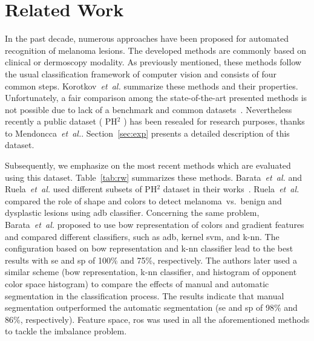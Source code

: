 \section{Related Work}
\label{sec:rw}
In the past decade, numerous approaches have been proposed for automated recognition of melanoma lesions.
The developed methods are commonly based on clinical or dermoscopy modality.
As previously mentioned, these methods follow the usual classification framework of computer vision and consists of four common steps.
Korotkov~\emph{et~al.}\cite{korotkov2012computerized} summarize these methods and their properties.
Unfortunately, a fair comparison among the state-of-the-art presented methods is not possible due to lack of a benchmark and common datasets~\cite{rastgoo2015automatic,korotkov2012computerized}.
Nevertheless recently a public dataset ( PH$^{2}$ ) has been resealed for research purposes, thanks to Mendoncca~\emph{et~al.}\cite{mendoncca2013ph}.
Section~\ref{sec:exp} presents a detailed description of this dataset.

Subsequently, we emphasize on the most recent methods which are evaluated using this dataset.
Table~\ref{tab:rw} summarizes these methods. 
Barata~\emph{et~al.}\cite{barata2013two,barata2013role} and Ruela~\emph{et~al.}\cite{ruela2013role,ruela2013color} used different subsets of PH$^{2}$ dataset in their works~\cite{mendoncca2013ph}.
Ruela~\emph{et~al.}\cite{ruela2013role,ruela2013color} compared the role of shape and colors to detect melanoma~vs.~benign and dysplastic lesions using \ac{adb} classifier.
Concerning the same problem, Barata~\emph{et~al.}\cite{barata2013two} proposed to use \ac{bow} representation of colors and gradient features and compared different classifiers, such as \ac{adb}, kernel \ac{svm}, and k-\ac{nn}.
The configuration based on \ac{bow} representation and k-\ac{nn} classifier lead to the best results with \ac{se} and \ac{sp} of 100\% and 75\%, respectively.
The authors later used a similar scheme (\ac{bow} representation, k-\ac{nn} classifier, and histogram of opponent color space histogram) to compare the effects of manual and automatic segmentation in the classification process.
The results indicate that manual segmentation outperformed the automatic segmentation (\ac{se} and \ac{sp} of 98\% and 86\%, respectively).
Feature space, \ac{ros} was used in all the aforementioned methods to tackle the imbalance problem.

